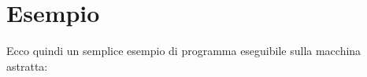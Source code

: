 \section{Esempio}
\label{sec:esempio}
Ecco quindi un semplice esempio di programma eseguibile sulla macchina astratta:


